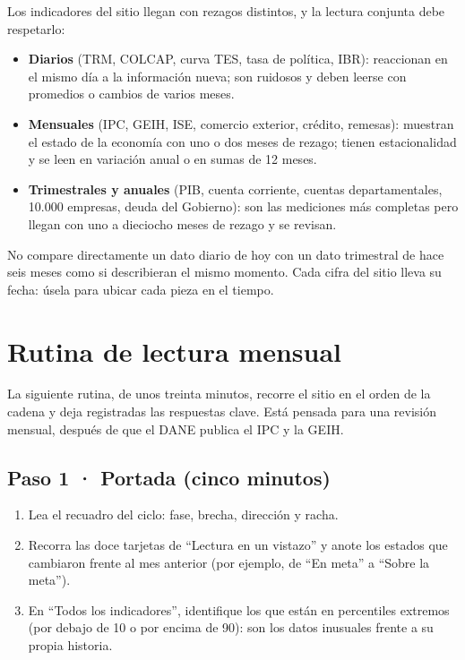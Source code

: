 Los indicadores del sitio llegan con rezagos distintos, y la lectura conjunta debe respetarlo:

\begin{itemize}
\item \textbf{Diarios} (TRM, COLCAP, curva TES, tasa de política, IBR): reaccionan en el mismo día a la información
  nueva; son ruidosos y deben leerse con promedios o cambios de varios meses.
\item \textbf{Mensuales} (IPC, GEIH, ISE, comercio exterior, crédito, remesas): muestran el estado de la economía con
  uno o dos meses de rezago; tienen estacionalidad y se leen en variación anual o en sumas de 12 meses.
\item \textbf{Trimestrales y anuales} (PIB, cuenta corriente, cuentas departamentales, 10.000 empresas, deuda del
  Gobierno): son las mediciones más completas pero llegan con uno a dieciocho meses de rezago y se revisan.
\end{itemize}

\begin{alerta}
No compare directamente un dato diario de hoy con un dato trimestral de hace seis meses como si describieran el mismo
momento. Cada cifra del sitio lleva su fecha: úsela para ubicar cada pieza en el tiempo.
\end{alerta}

\chapter{Rutina de lectura mensual}
\label{es:i:rutina}

La siguiente rutina, de unos treinta minutos, recorre el sitio en el orden de la cadena y deja registradas las
respuestas clave. Está pensada para una revisión mensual, después de que el DANE publica el IPC y la GEIH.

\section{Paso 1 · Portada (cinco minutos)}
\begin{enumerate}
\item Lea el recuadro del ciclo: fase, brecha, dirección y racha.
\item Recorra las doce tarjetas de ``Lectura en un vistazo'' y anote los estados que cambiaron frente al mes
  anterior (por ejemplo, de ``En meta'' a ``Sobre la meta'').
\item En ``Todos los indicadores'', identifique los que están en percentiles extremos (por debajo de 10 o por
  encima de 90): son los datos inusuales frente a su propia historia.
\end{enumerate}

